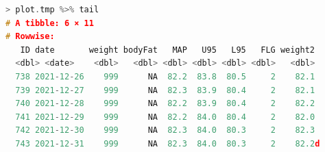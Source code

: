 \begin{lstlisting}[language=c++,label={code:29_05},caption={予想される2021年末の体重(一部略)}]
> plot.tmp %>% tail
# A tibble: 6 × 11
# Rowwise: 
   ID date       weight bodyFat   MAP   U95   L95   FLG weight2
  <dbl> <date>    <dbl>   <dbl> <dbl> <dbl> <dbl> <dbl>   <dbl>
  738 2021-12-26    999      NA  82.2  83.8  80.5     2    82.1
  739 2021-12-27    999      NA  82.3  83.9  80.4     2    82.1
  740 2021-12-28    999      NA  82.2  83.9  80.4     2    82.2
  741 2021-12-29    999      NA  82.2  84.0  80.4     2    82.0
  742 2021-12-30    999      NA  82.3  84.0  80.3     2    82.3
  743 2021-12-31    999      NA  82.3  84.0  80.3     2    82.2d
\end{lstlisting}

